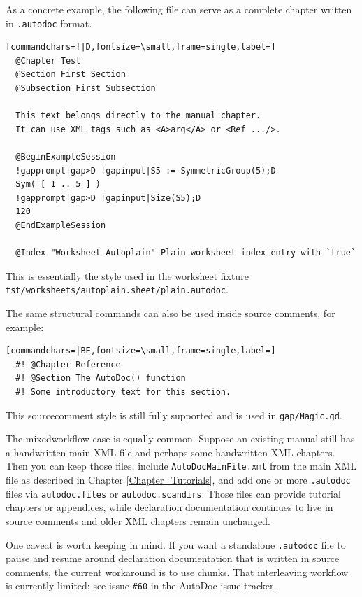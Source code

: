 \documentclass[a4paper,11pt]{report}
\begin{document}
{{ As a concrete example, the following file can serve as a complete chapter
written in \texttt{.autodoc} format. 

 
\begin{Verbatim}[commandchars=!|D,fontsize=\small,frame=single,label=]
  @Chapter Test
  @Section First Section
  @Subsection First Subsection
  
  This text belongs directly to the manual chapter.
  It can use XML tags such as <A>arg</A> or <Ref .../>.
  
  @BeginExampleSession
  !gapprompt|gap>D !gapinput|S5 := SymmetricGroup(5);D
  Sym( [ 1 .. 5 ] )
  !gapprompt|gap>D !gapinput|Size(S5);D
  120
  @EndExampleSession
  
  @Index "Worksheet Autoplain" Plain worksheet index entry with `true`
\end{Verbatim}
 

 This is essentially the style used in the worksheet fixture \texttt{tst/worksheets/autoplain.sheet/plain.autodoc}. 

 The same structural commands can also be used inside source comments, for
example: 

 
\begin{Verbatim}[commandchars=|BE,fontsize=\small,frame=single,label=]
  #! @Chapter Reference
  #! @Section The AutoDoc() function
  #! Some introductory text for this section.
\end{Verbatim}
 

 This source\texttt{}comment style is still fully supported and is
used in \texttt{gap/Magic.gd}. 

 The mixed\texttt{}workflow case is equally common. Suppose an
existing manual still has a hand\texttt{}written main XML file and
perhaps some hand\texttt{}written XML chapters. Then you can keep
those files, include \texttt{{\textunderscore}AutoDocMainFile.xml} from the main XML file as described in Chapter \ref{Chapter_Tutorials}, and add one or more \texttt{.autodoc} files via \texttt{autodoc.files} or \texttt{autodoc.scan{\textunderscore}dirs}. Those files can provide tutorial chapters or appendices, while declaration
documentation continues to live in source comments and older XML chapters
remain unchanged. 

 One caveat is worth keeping in mind. If you want a standalone \texttt{.autodoc} file to pause and resume around declaration documentation that is written in
source comments, the current workaround is to use chunks. That interleaving
workflow is currently limited; see issue \texttt{\#60} in the AutoDoc issue tracker. 

}}
\end{document}
